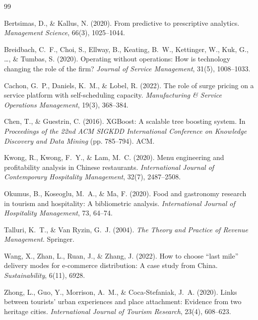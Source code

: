 \documentclass[10pt,a4paper,twocolumn]{article}
\begin{document}
\begin{thebibliography}{99}

Bertsimas, D., \& Kallus, N. (2020).
From predictive to prescriptive analytics.
\textit{Management Science}, 66(3), 1025--1044.

Breidbach, C.~F., Choi, S., Ellway, B., Keating, B.~W., Kettinger, W.,
Kuk, G., \ldots, \& Tumbas, S. (2020).
Operating without operations: How is technology changing the role of the firm?
\textit{Journal of Service Management}, 31(5), 1008--1033.

Cachon, G.~P., Daniels, K.~M., \& Lobel, R. (2022).
The role of surge pricing on a service platform with self-scheduling capacity.
\textit{Manufacturing \& Service Operations Management}, 19(3), 368--384.

Chen, T., \& Guestrin, C. (2016).
XGBoost: A scalable tree boosting system.
In \textit{Proceedings of the 22nd ACM SIGKDD International Conference on
Knowledge Discovery and Data Mining} (pp. 785--794). ACM.

Kwong, R., Kwong, F.~Y., \& Lam, M.~C. (2020).
Menu engineering and profitability analysis in Chinese restaurants.
\textit{International Journal of Contemporary Hospitality Management}, 32(7), 2487--2508.

Okumus, B., Koseoglu, M.~A., \& Ma, F. (2020).
Food and gastronomy research in tourism and hospitality: A bibliometric analysis.
\textit{International Journal of Hospitality Management}, 73, 64--74.

Talluri, K.~T., \& Van Ryzin, G.~J. (2004).
\textit{The Theory and Practice of Revenue Management}.
Springer.

Wang, X., Zhan, L., Ruan, J., \& Zhang, J. (2022).
How to choose ``last mile'' delivery modes for e-commerce distribution:
A case study from China.
\textit{Sustainability}, 6(11), 6928.

Zhong, L., Guo, Y., Morrison, A.~M., \& Coca-Stefaniak, J.~A. (2020).
Links between tourists' urban experiences and place attachment:
Evidence from two heritage cities.
\textit{International Journal of Tourism Research}, 23(4), 608--623.

\end{thebibliography}
\end{document}
